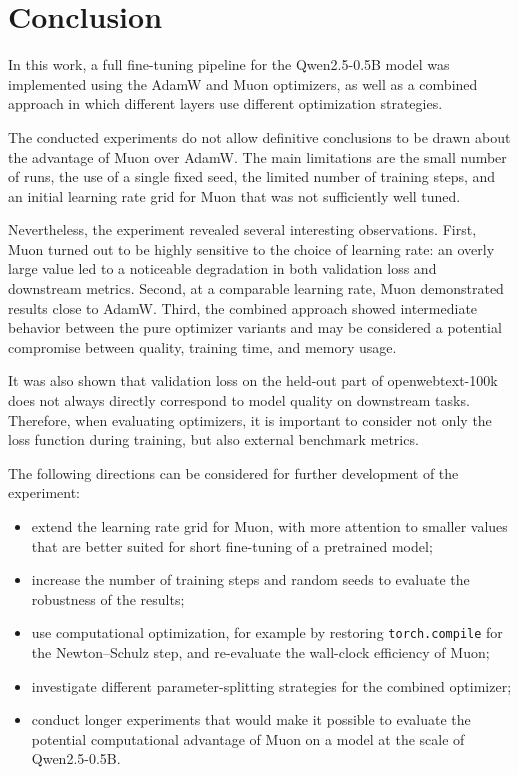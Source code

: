 \documentclass{article}
\begin{document}
\section{Conclusion}

In this work, a full fine-tuning pipeline for the Qwen2.5-0.5B model was implemented using the AdamW and Muon optimizers, as well as a combined approach in which different layers use different optimization strategies.

The conducted experiments do not allow definitive conclusions to be drawn about the advantage of Muon over AdamW. The main limitations are the small number of runs, the use of a single fixed seed, the limited number of training steps, and an initial learning rate grid for Muon that was not sufficiently well tuned.

Nevertheless, the experiment revealed several interesting observations. First, Muon turned out to be highly sensitive to the choice of learning rate: an overly large value led to a noticeable degradation in both validation loss and downstream metrics. Second, at a comparable learning rate, Muon demonstrated results close to AdamW. Third, the combined approach showed intermediate behavior between the pure optimizer variants and may be considered a potential compromise between quality, training time, and memory usage.

It was also shown that validation loss on the held-out part of openwebtext-100k does not always directly correspond to model quality on downstream tasks. Therefore, when evaluating optimizers, it is important to consider not only the loss function during training, but also external benchmark metrics.

The following directions can be considered for further development of the experiment:
\begin{itemize}
    \item extend the learning rate grid for Muon, with more attention to smaller values that are better suited for short fine-tuning of a pretrained model;
    \item increase the number of training steps and random seeds to evaluate the robustness of the results;
    \item use computational optimization, for example by restoring \texttt{torch.compile} for the Newton--Schulz step, and re-evaluate the wall-clock efficiency of Muon;
    \item investigate different parameter-splitting strategies for the combined optimizer;
    \item conduct longer experiments that would make it possible to evaluate the potential computational advantage of Muon on a model at the scale of Qwen2.5-0.5B.
\end{itemize}
\end{document}
